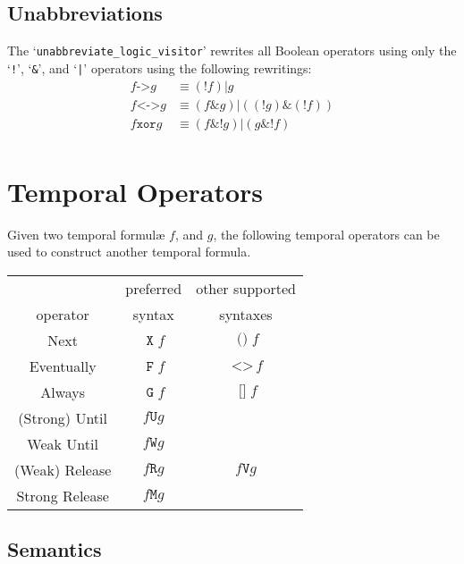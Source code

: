 \documentclass[a4paper,twoside,10pt,DIV=12,draft]{scrreprt}
\DeclareMathOperator{\F}{\texttt{F}}
\DeclareMathOperator{\FALT}{\texttt{<>}}
\DeclareMathOperator{\G}{\texttt{G}}
\DeclareMathOperator{\GALT}{\texttt{[]}}
\newcommand{\U}{\mathbin{\texttt{U}}}
\newcommand{\R}{\mathbin{\texttt{R}}}
\newcommand{\RALT}{\mathbin{\texttt{V}}}
\DeclareMathOperator{\X}{\texttt{X}}
\DeclareMathOperator{\XALT}{\texttt{()}}
\newcommand{\M}{\mathbin{\texttt{M}}}
\newcommand{\W}{\mathbin{\texttt{W}}}
\DeclareMathOperator{\NOT}{\texttt{!}}
\newcommand{\XOR}{\mathbin{\texttt{xor}}}
\newcommand{\IMPLIES}{\mathbin{\texttt{->}}}
\newcommand{\EQUIV}{\mathbin{\texttt{<->}}}
\newcommand{\OR}{\mathbin{\texttt{|}}}
\newcommand{\AND}{\mathbin{\texttt{\&}}}
\newcommand{\0}{\texttt{0}}
\newcommand{\1}{\texttt{1}}
\newcommand\samp[1]{`\texttt{#1}'}
\begin{document}
\subsection{Unabbreviations}\label{sec:unabbbool}

The `\verb=unabbreviate_logic_visitor=' rewrites all Boolean operators
using only the \samp{!}, \samp{\&}, and \samp{|} operators using the
following rewritings:
\begin{align*}
  f\IMPLIES g &\equiv  (\NOT f)\OR g\\
  f\EQUIV g &\equiv  (f\AND g)\OR ((\NOT g)\AND(\NOT f))\\
  f\XOR g &\equiv  (f\AND\NOT g)\OR (g\AND\NOT f)\\
\end{align*}

\section{Temporal Operators}

Given two temporal formul\ae{} $f$, and $g$, the following
temporal operators can be used to construct another temporal formula.

\begin{center}
\begin{tabular}{ccc}
                 & preferred & \multicolumn{1}{c}{other supported} \\
   operator      & syntax    & \multicolumn{1}{c}{syntaxes}\\
  \hline
  Next           & $\X f$    & $\XALT f$ \\
  Eventually     & $\F f$    & $\FALT f$ \\
  Always         & $\G f$    & $\GALT f$ \\
  (Strong) Until & $f \U g$ \\
  Weak Until     & $f \W g$ \\
  (Weak) Release & $f \R g$  & $f \RALT g$ \\
  Strong Release & $f \M g$ \\
\end{tabular}
\end{center}

\subsection{Semantics}\label{sec:opltl:sem}
\end{document}
